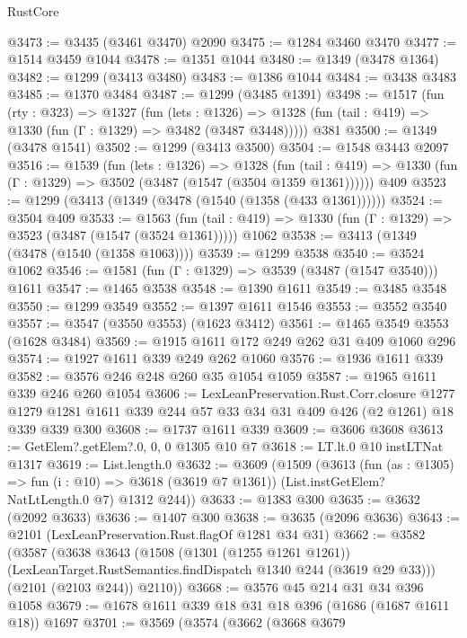 \begin{lexlean}{RustCore}
\begin{coremodule}
@3473 := @3435 (@3461 @3470) @2090
@3475 := @1284 @3460 @3470
@3477 := @1514 @3459 @1044
@3478 := @1351 @1044
@3480 := @1349 (@3478 @1364)
@3482 := @1299 (@3413 @3480)
@3483 := @1386 @1044
@3484 := @3438 @3483
@3485 := @1370 @3484
@3487 := @1299 (@3485 @1391)
@3498 := @1517
    (fun (rty : @323) =>
    @1327
      (fun (lets : @1326) =>
      @1328 (fun (tail : @419) => @1330 (fun (Γ : @1329) => @3482 (@3487 @3448)))))
    @381
@3500 := @1349 (@3478 @1541)
@3502 := @1299 (@3413 @3500)
@3504 := @1548 @3443 @2097
@3516 := @1539
    (fun (lets : @1326) =>
    @1328
      (fun (tail : @419) => @1330 (fun (Γ : @1329) => @3502 (@3487 (@1547 (@3504 @1359 @1361))))))
    @409
@3523 := @1299 (@3413 (@1349 (@3478 (@1540 (@1358 (@433 @1361))))))
@3524 := @3504 @409
@3533 := @1563
    (fun (tail : @419) => @1330 (fun (Γ : @1329) => @3523 (@3487 (@1547 (@3524 @1361)))))
    @1062
@3538 := @3413 (@1349 (@3478 (@1540 (@1358 @1063))))
@3539 := @1299 @3538
@3540 := @3524 @1062
@3546 := @1581 (fun (Γ : @1329) => @3539 (@3487 (@1547 @3540))) @1611
@3547 := @1465 @3538
@3548 := @1390 @1611
@3549 := @3485 @3548
@3550 := @1299 @3549
@3552 := @1397 @1611 @1546
@3553 := @3552 @3540
@3557 := @3547 (@3550 @3553) (@1623 @3412)
@3561 := @1465 @3549 @3553 (@1628 @3484)
@3569 := @1915 @1611 @172 @249 @262 @31 @409 @1060 @296
@3574 := @1927 @1611 @339 @249 @262 @1060
@3576 := @1936 @1611 @339
@3582 := @3576 @246 @248 @260 @35 @1054 @1059
@3587 := @1965 @1611 @339 @246 @260 @1054
@3606 := LexLeanPreservation.Rust.Corr.closure
    @1277
    @1279
    @1281
    @1611
    @339
    @244
    @57
    @33
    @34
    @31
    @409
    @426
    (@2 @1261)
    @18
    @339
    @339
    @300
@3608 := @1737 @1611 @339
@3609 := @3606 @3608
@3613 := GetElem?.getElem?.{0, 0, 0} @1305 @10 @7
@3618 := LT.lt.{0} @10 instLTNat @1317
@3619 := List.length.{0}
@3632 := @3609
    (@1509
      (@3613
        (fun (as : @1305) => fun (i : @10) => @3618 (@3619 @7 @1361))
        (List.instGetElem?NatLtLength.{0} @7)
        @1312
        @244))
@3633 := @1383 @300
@3635 := @3632 (@2092 @3633)
@3636 := @1407 @300
@3638 := @3635 (@2096 @3636)
@3643 := @2101 (LexLeanPreservation.Rust.flagOf @1281 @34 @31)
@3662 := @3582
    (@3587
      (@3638
        @3643
        (@1508
          (@1301 (@1255 @1261 @1261))
          (LexLeanTarget.RustSemantics.findDispatch @1340 @244 (@3619 @29 @33)))
        (@2101 (@2103 @244))
        @2110))
@3668 := @3576 @45 @214 @31 @34 @396 @1058
@3679 := @1678 @1611 @339 @18 @31 @18 @396 (@1686 (@1687 @1611 @18)) @1697
@3701 := @3569
    (@3574
      (@3662
        (@3668
          @3679

\end{coremodule}
\end{lexlean}
